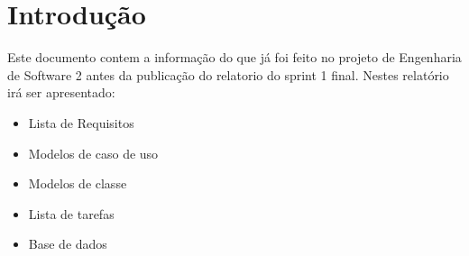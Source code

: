 \section{Introdução}
Este documento contem a informação do que já foi feito no projeto de Engenharia de Software 2 antes da publicação do relatorio do sprint 1 final.
Nestes relatório irá ser apresentado:
\begin{itemize}
    \item Lista de Requisitos
    \item Modelos de caso de uso
    \item Modelos de classe
    \item Lista de tarefas
    \item Base de dados
\end{itemize}
